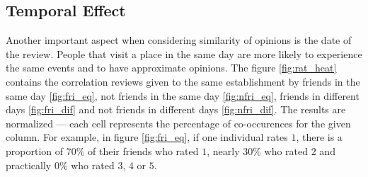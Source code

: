 \subsection{Temporal Effect}
Another important aspect when considering similarity of opinions is the date of
the review. People that visit a place in the same day are more likely to
experience the same events and to have approximate opinions. The figure
\ref{fig:rat_heat} contains the correlation reviews given to the same
establishment by friends in the same day \ref{fig:fri_eq}, not friends in the
same day \ref{fig:nfri_eq}, friends in different days \ref{fig:fri_dif} and not
friends in different days \ref{fig:nfri_dif}. The results are normalized ---
each cell represents the percentage of co-occurences for the given column. For
example, in figure \ref{fig:fri_eq}, if one individual rates $1$, there is a
proportion of $70$\% of their friends who rated $1$, nearly $30$\% who rated $2$
and practically $0$\% who rated $3$, $4$ or $5$.

